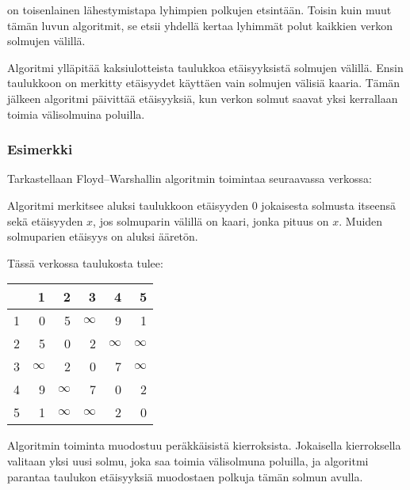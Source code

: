 
on toisenlainen lähestymistapa
lyhimpien polkujen etsintään.
Toisin kuin muut tämän luvun algoritmit,
se  etsii yhdellä kertaa lyhimmät polut kaikkien
verkon solmujen välillä.


Algoritmi ylläpitää kaksiulotteista
taulukkoa etäisyyksistä solmujen
välillä.
Ensin taulukkoon on merkitty
etäisyydet käyttäen vain solmujen
välisiä kaaria.
Tämän jälkeen algoritmi
päivittää etäisyyksiä,
kun verkon solmut saavat yksi kerrallaan
toimia välisolmuina poluilla.

\subsubsection{Esimerkki}

Tarkastellaan Floyd–Warshallin
algoritmin toimintaa seuraavassa verkossa:

\begin{center}
\end{center}

Algoritmi merkitsee aluksi taulukkoon
etäisyyden 0 jokaisesta solmusta itseensä
sekä etäisyyden $x$, jos solmuparin välillä
on kaari, jonka pituus on $x$.
Muiden solmuparien etäisyys on aluksi ääretön.

Tässä verkossa taulukosta tulee:
\begin{center}
\begin{tabular}{r|rrrrr}
 & 1 & 2 & 3 & 4 & 5 \\
\hline
1 & 0 & 5 & $\infty$ & 9 & 1 \\
2 & 5 & 0 & 2 & $\infty$ & $\infty$ \\
3 & $\infty$ & 2 & 0 & 7 & $\infty$ \\
4 & 9 & $\infty$ & 7 & 0 & 2 \\
5 & 1 & $\infty$ & $\infty$ & 2 & 0 \\
\end{tabular}
\end{center}
\vspace{10pt}
Algoritmin toiminta muodostuu peräkkäisistä kierroksista.
Jokaisella kierroksella valitaan yksi uusi solmu,
joka saa toimia välisolmuna poluilla,
ja algoritmi parantaa taulukon
etäisyyksiä muodostaen polkuja tämän solmun avulla.

